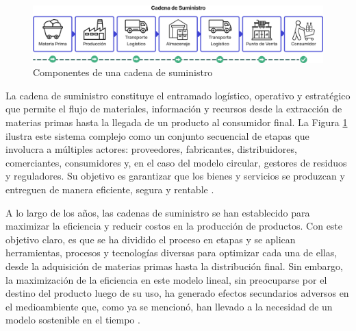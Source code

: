 \begin{figure}[!b]
    \centering
    \includegraphics[width=\textwidth]{Figures/supply-chain.png}
    \caption{Componentes de una cadena de suministro}
    \label{fig:supply-chain}
\end{figure}

La cadena de suministro constituye el entramado logístico, operativo y estratégico que permite el flujo de materiales, información y recursos desde la extracción de materias primas hasta la llegada de un producto al consumidor final. La Figura \ref{fig:supply-chain} ilustra este sistema complejo como un conjunto secuencial de etapas que involucra a múltiples actores: proveedores, fabricantes, distribuidores, comerciantes, consumidores y, en el caso del modelo circular, gestores de residuos y reguladores. Su objetivo es garantizar que los bienes y servicios se produzcan y entreguen de manera eficiente, segura y rentable \cite{rodriguez2023modelamiento}.

A lo largo de los años, las cadenas de suministro se han establecido para maximizar la eficiencia y reducir costos en la producción de productos. Con este objetivo claro, es que se ha dividido el proceso en etapas y se aplican herramientas, procesos y tecnologías diversas para optimizar cada una de ellas, desde la adquisición de materias primas hasta la distribución final. Sin embargo, la maximización de la eficiencia en este modelo lineal, sin preocuparse por el destino del producto luego de su uso, ha generado efectos secundarios adversos en el medioambiente que, como ya se mencionó, han llevado a la necesidad de un modelo sostenible en el tiempo \cite{espanacircular2030}.

